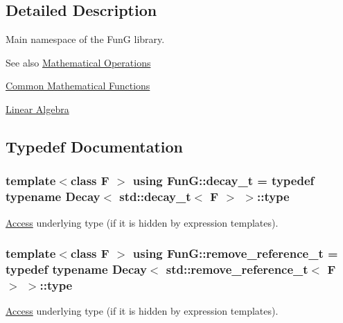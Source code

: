 \subsection{Detailed Description}
Main namespace of the FunG library. 

\begin{DoxySeeAlso}{See also}
\hyperlink{group__MathematicalOperationsGroup}{Mathematical Operations} 

\hyperlink{group__CMathGroup}{Common Mathematical Functions} 

\hyperlink{group__LinearAlgebraGroup}{Linear Algebra} 
\end{DoxySeeAlso}


\subsection{Typedef Documentation}
\subsubsection[{\texorpdfstring{decay\+\_\+t}{decay_t}}]{\setlength{\rightskip}{0pt plus 5cm}template$<$class F $>$ using {\bf Fun\+G\+::decay\+\_\+t} = typedef typename {\bf Decay}$<$ std\+::decay\+\_\+t$<$ F $>$ $>$\+::type}\hypertarget{namespaceFunG_a7ff91644f18a190ac3d4fc9e970ebe2e}{}\label{namespaceFunG_a7ff91644f18a190ac3d4fc9e970ebe2e}


\hyperlink{namespaceFunG_1_1Access}{Access} underlying type (if it is hidden by expression templates). 

\subsubsection[{\texorpdfstring{remove\+\_\+reference\+\_\+t}{remove_reference_t}}]{\setlength{\rightskip}{0pt plus 5cm}template$<$class F $>$ using {\bf Fun\+G\+::remove\+\_\+reference\+\_\+t} = typedef typename {\bf Decay}$<$ std\+::remove\+\_\+reference\+\_\+t$<$ F $>$ $>$\+::type}\hypertarget{namespaceFunG_a40f6d0896c1e3837d442d39418a4f609}{}\label{namespaceFunG_a40f6d0896c1e3837d442d39418a4f609}


\hyperlink{namespaceFunG_1_1Access}{Access} underlying type (if it is hidden by expression templates). 

